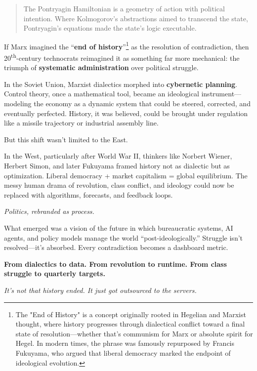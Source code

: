 \begin{quote}
The Pontryagin Hamiltonian is a geometry of action with political intention. Where Kolmogorov’s abstractions aimed to transcend the state, Pontryagin’s equations made the state's logic executable.
\end{quote}


\begin{tcolorbox}[title=Sidebar: From Marx to Machines — The End of History Becomes the Reign of Systems, colback=gray!10, colframe=black, fonttitle=\bfseries, breakable]

  If Marx imagined the ``\textbf{end of history}''\footnote{The "End of History" is a concept originally rooted in Hegelian and Marxist thought, where history progresses through dialectical conflict toward a final state of resolution—whether that’s communism for Marx or absolute spirit for Hegel. In modern times, the phrase was famously repurposed by Francis Fukuyama, who argued that liberal democracy marked the endpoint of ideological evolution.} as the resolution of contradiction, then 20\textsuperscript{th}-century technocrats reimagined it as something far more mechanical: the triumph of \textbf{systematic administration} over political struggle.
  
  In the Soviet Union, Marxist dialectics morphed into \textbf{cybernetic planning}. Control theory, once a mathematical tool, became an ideological instrument—modeling the economy as a dynamic system that could be steered, corrected, and eventually perfected. History, it was believed, could be brought under regulation like a missile trajectory or industrial assembly line.
  
  But this shift wasn’t limited to the East.
  
  In the West, particularly after World War II, thinkers like Norbert Wiener, Herbert Simon, and later Fukuyama framed history not as dialectic but as optimization. Liberal democracy + market capitalism = global equilibrium. The messy human drama of revolution, class conflict, and ideology could now be replaced with algorithms, forecasts, and feedback loops.
  
  \textit{Politics, rebranded as process.}
  
  What emerged was a vision of the future in which bureaucratic systems, AI agents, and policy models manage the world “post-ideologically.” Struggle isn’t resolved—it’s absorbed. Every contradiction becomes a dashboard metric.
  
  \textbf{From dialectics to data. From revolution to runtime. From class struggle to quarterly targets.}
  
  \textit{It’s not that history ended. It just got outsourced to the servers.}
  
\end{tcolorbox}



